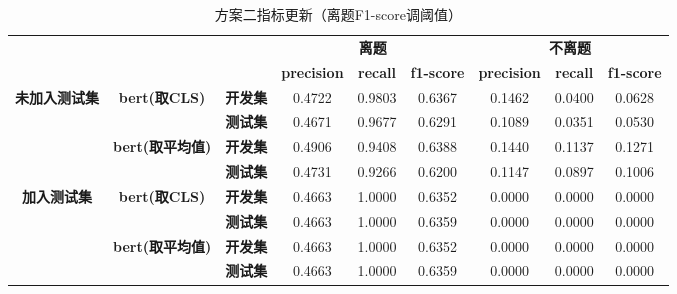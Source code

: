 \documentclass[11pt]{article}
\begin{document}
\begin{CJK}{UTF8}{gkai}
\begin{table}[htbp]\small
  \centering
    \begin{tabular}{c|cc|ccc|ccc}
      \hline
      \multicolumn{3}{c}{\multirow{2}[0]{*}{\textcolor[rgb]{ 1,  0,  0}{}}} & \multicolumn{3}{c}{\textbf{离题}} & \multicolumn{3}{c}{\textbf{不离题}} \\
      \multicolumn{3}{c}{}  & \textbf{precision} & \textbf{recall} & \textbf{f1-score} & \textbf{precision} & \textbf{recall} & \textbf{f1-score} \\
      \hline
      \multirow{4}[0]{*}{\textbf{未加入测试集}} & \multirow{2}[0]{*}{\textbf{bert(取CLS)}} & \textbf{开发集} & 0.4722  & 0.9803  & 0.6367  & 0.1462  & 0.0400  & 0.0628  \\
      &       & \textbf{测试集} & 0.4671  & 0.9677  & 0.6291  & 0.1089  & 0.0351  & 0.0530  \\
      \cline{2-9}
      & \multirow{2}[0]{*}{\textbf{bert(取平均值)}} & \textbf{开发集} & 0.4906  & 0.9408  & 0.6388  & 0.1440  & 0.1137  & 0.1271  \\
      &       & \textbf{测试集} & 0.4731  & 0.9266  & 0.6200  & 0.1147  & 0.0897  & 0.1006  \\
      \hline
      \multirow{4}[0]{*}{\textbf{加入测试集}} & \multirow{2}[0]{*}{\textbf{bert(取CLS)}} & \textbf{开发集} & 0.4663  & 1.0000  & 0.6352  & 0.0000  & 0.0000  & 0.0000  \\
      &       & \textbf{测试集} & 0.4663  & 1.0000  & 0.6359  & 0.0000  & 0.0000  & 0.0000  \\
      \cline{2-9}
      & \multirow{2}[0]{*}{\textbf{bert(取平均值)}} & \textbf{开发集} & 0.4663  & 1.0000  & 0.6352  & 0.0000  & 0.0000  & 0.0000  \\
      &       & \textbf{测试集} & 0.4663  & 1.0000  & 0.6359  & 0.0000  & 0.0000  & 0.0000  \\
      \hline
    \end{tabular}%
    \caption{方案二指标更新（离题F1-score调阈值）}
  \label{tab:addlabel}%
\end{table}%


\end{CJK}
\end{document}
